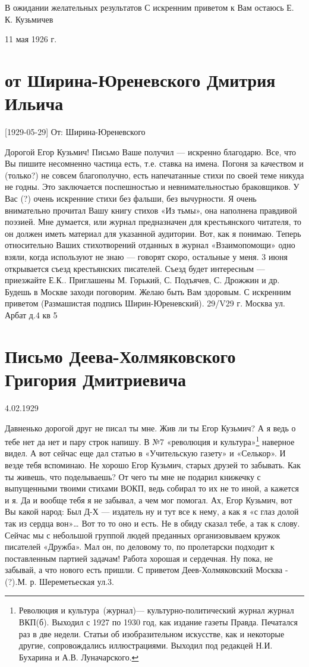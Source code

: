 \documentclass[]{memoir}
\begin{document}
В ожидании желательных результатов
С искренним приветом к Вам остаюсь
Е. К. Кузьмичев

11 мая 1926 г.



\section{от Ширина-Юреневского Дмитрия Ильича}
[1929-05-29]
От: Ширина-Юреневского

Дорогой Егор Кузьмич!
Письмо Ваше получил --- искренно благодарю.
Все, что Вы пишите несомненно частица есть, т.е. ставка на имена.  Погоня за качеством и (только?) не совсем благополучно, есть напечатанные стихи по своей теме никуда не годны. Это заключается поспешностью и невнимательностью браковщиков. У Вас (?) очень искренние стихи без фальши, без вычурности. Я очень внимательно прочитал Вашу книгу стихов «Из тьмы», она наполнена правдивой поэзией. Мне думается, или журнал предназначен для крестьянского читателя, то он должен иметь материал для указанной аудитории. Вот, как я понимаю. Теперь относительно Ваших стихотворений отданных в журнал «Взаимопомощи» одно взяли, когда используют не знаю — говорят скоро, остальные у меня. 3 июня открывается съезд крестьянских писателей. Съезд будет интересным — приезжайте Е.К.. Приглашены М. Горький, С. Подъячев, С. Дрожжин и др. Будешь в Москве заходи поговорим. Желаю быть Вам здоровым.
С искренним приветом (Размашистая подпись Ширин-Юреневский).
29/V29 г.
Москва ул. Арбат д.4 кв 5



\section{Письмо Деева-Холмяковского Григория Дмитриевича}


4.02.1929

Давненько дорогой друг не писал ты мне.
Жив ли ты Егор Кузьмич? А я ведь о тебе нет да нет и пару строк напишу. В №7 «революция и культура»\footnote{Революция и культура (журнал)— культурно-политический журнал журнал ВКП(б). Выходил с 1927 по 1930 год, как издание газеты Правда. Печатался раз в две недели. Статьи об изобразительном искусстве, как и некоторые другие, сопровождались иллюстрациями. Выходил под редакцей Н.И. Бухарина и А.В. Луначарского.} наверное видел. А вот сейчас еще дал статью в «Учительскую газету» и «Селькор». И везде тебя вспоминаю. Не хорошо Егор Кузьмич, старых друзей то забывать. Как ты живешь, что поделываешь? От чего ты мне не подарил книжечку с выпущенными твоими стихами ВОКП, ведь собирал то их не то иной, а кажется и я. Да и вообще тебя я не забывал, а чем мог помогал. Ах, Егор Кузьмич, вот Вы какой народ: Был Д-Х — издатель ну и тут все к нему, а как я «с глаз долой так из сердца вон»… Вот то то оно и есть. Не в обиду сказал тебе, а так к слову. Сейчас мы с небольшой группой людей преданных организовываем кружок писателей «Дружба». Мал он, по деловому то, по пролетарски подходит к поставленным партией задачам!
Работа хорошая и сердечная. Ну пока, не забывай, а что нового есть пришли.
С приветом Деев-Холмяковский
Москва - (?).М. р. Шереметьеская ул.3.
\end{document}
